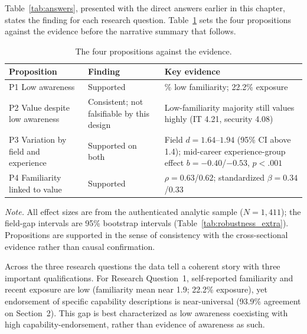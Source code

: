 Table~\ref{tab:answers}, presented with the direct answers earlier in this chapter, states the finding for each research question. Table~\ref{tab:glance} sets the four propositions against the evidence before the narrative summary that follows.

\begin{table}[htbp]
  \centering
  \caption{The four propositions against the evidence.}\label{tab:glance}
  \small
  \begin{tabular}{@{}>{\raggedright\arraybackslash}p{}>{\raggedright\arraybackslash}p{}>{\raggedright\arraybackslash}p{}@{}}
    \toprule
    \textbf{Proposition} & \textbf{Finding} & \textbf{Key evidence} \\
    \midrule
    P1 Low awareness & Supported & 78.2\% low familiarity; 22.2\% exposure \\
    \addlinespace
    P2 Value despite low awareness & Consistent; not falsifiable by this design & Low-familiarity majority still values highly (IT 4.21, security 4.08) \\
    \addlinespace
    P3 Variation by field and experience & Supported on both & Field $d=1.64$--$1.94$ (95\% CI above 1.4); mid-career experience-group effect $b=-0.40$/$-0.53$, $p<.001$ \\
    \addlinespace
    P4 Familiarity linked to value & Supported & $\rho=0.63$/$0.62$; standardized $\beta=0.34$/$0.33$ \\
    \bottomrule
  \end{tabular}
  \smallskip

  {\footnotesize \textit{Note.} All effect sizes are from the authenticated analytic sample ($N=1{,}411$); the field-gap intervals are 95\% bootstrap intervals (Table~\ref{tab:robustness_extra}). Propositions are supported in the sense of consistency with the cross-sectional evidence rather than causal confirmation.}
\end{table}

Across the three research questions the data tell a coherent story with three important qualifications. For Research Question~1, self-reported familiarity and recent exposure are low (familiarity mean near 1.9; 22.2\% exposure), yet endorsement of specific capability descriptions is near-universal (93.9\% agreement on Section~2). This gap is best characterized as low awareness coexisting with high capability-endorsement, rather than evidence of awareness as such.

